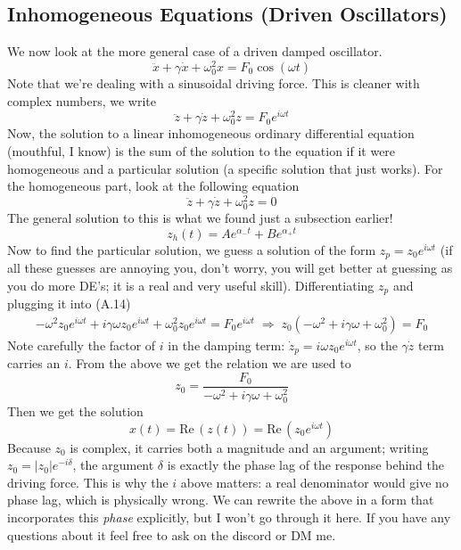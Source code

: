 \documentclass{report}
\numberwithin{equation}{section}
\begin{document}
\subsection{Inhomogeneous Equations (Driven Oscillators)}
We now look at the more general case of a driven damped oscillator.
\begin{equation}
	\ddot{x} + \gamma\dot{x} + \omega_0^2 x = F_0\cos(\omega t)
\end{equation}
Note that we're dealing with a sinusoidal driving force. This is cleaner with complex numbers, we write
\begin{equation}
	\ddot{z} + \gamma\dot{z} +\omega_0^2 z = F_0e^{i\omega t}
\end{equation}
Now, the solution to a linear inhomogeneous ordinary differential equation (mouthful, I know) is the sum of the solution to the equation if it were homogeneous and a particular solution (a specific solution that just works). For the homogeneous part, look at the following equation
\begin{equation}
	\ddot{z} + \gamma\dot{z} +\omega_0^2 z = 0
\end{equation}
The general solution to this is what we found just a subsection earlier!
\begin{equation}
	z_h(t) = Ae^{\alpha_- t} + Be^{\alpha_+ t}
\end{equation}
Now to find the particular solution, we guess a solution of the form $z_p = z_0e^{i\omega t}$ (if all these guesses are annoying you, don't worry, you will get better at guessing as you do more DE's; it is a real and very useful skill). Differentiating $z_p$ and plugging it into (A.14)
\begin{align*}
	-\omega^2z_0e^{i\omega t} + i\gamma\omega z_0e^{i\omega t} +\omega_0^2z_0e^{i\omega t} = F_0e^{i\omega t}
	\;\Rightarrow\; z_0\left(-\omega^2 + i\gamma\omega + \omega_0^2\right) = F_0
\end{align*}
Note carefully the factor of $i$ in the damping term: $\dot z_p = i\omega z_0 e^{i\omega t}$, so the $\gamma\dot z$ term carries an $i$. From the above we get the relation we are used to
\begin{equation}
	z_0 = \frac{F_0}{-\omega^2 + i\gamma\omega + \omega_0^2}
\end{equation}
Then we get the solution
\begin{equation}
	x(t) = \mathrm{Re}\,(z(t)) = \mathrm{Re}\,(z_0e^{i\omega t})
\end{equation}
Because $z_0$ is complex, it carries both a magnitude and an argument; writing $z_0 = |z_0|e^{-i\delta}$, the argument $\delta$ is exactly the phase lag of the response behind the driving force. This is why the $i$ above matters: a real denominator would give no phase lag, which is physically wrong. We can rewrite the above in a form that incorporates this \textit{phase} explicitly, but I won't go through it here. If you have any questions about it feel free to ask on the discord or DM me.
\end{document}
